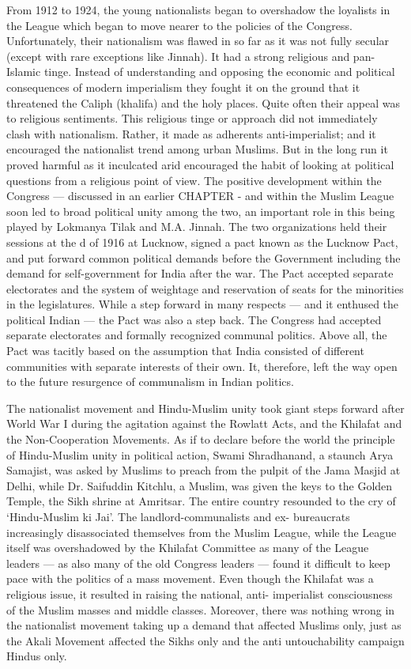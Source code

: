 From 1912 to 1924, the young nationalists began to overshadow the loyalists in the League which began to move nearer to the policies of the Congress. Unfortunately, their nationalism was flawed in so far as it was not fully secular (except with rare exceptions like Jinnah). It had a strong religious and pan-Islamic tinge. Instead of understanding and opposing the economic and political consequences of modern imperialism they fought it on the ground that it threatened the Caliph (khalifa) and the holy places. Quite often their appeal was to religious sentiments. This religious tinge or approach did not immediately clash with nationalism. Rather, it made as adherents anti-imperialist; and it encouraged the nationalist trend among urban Muslims. But in the long run it proved harmful as it inculcated arid encouraged the habit of looking at political questions from a religious point of view. The positive development within the Congress — discussed in an earlier CHAPTER - and within the Muslim League soon led to broad political unity among the two, an important role in this being played by Lokmanya Tilak and M.A. Jinnah. The two organizations held their sessions at the d of 1916 at Lucknow, signed a pact known as the Lucknow Pact, and put forward common political demands before the Government including the demand for self-government for India after the war. The Pact accepted separate electorates and the system of weightage and reservation of seats for the minorities in the legislatures. While a step forward in many respects — and it enthused the political Indian — the Pact was also a step back. The Congress had accepted separate electorates and formally recognized communal politics. Above all, the Pact was tacitly based on the assumption that India consisted of different communities with separate interests of their own. It, therefore, left the way open to the future resurgence of communalism in Indian politics. 

The nationalist movement and Hindu-Muslim unity took giant steps forward after World War I during the agitation against the Rowlatt Acts, and the Khilafat and the Non-Cooperation Movements. As if to declare before the world the principle of Hindu-Muslim unity in political action, Swami Shradhanand, a staunch Arya Samajist, was asked by Muslims to preach from the pulpit of the Jama Masjid at Delhi, while Dr. Saifuddin Kitchlu, a Muslim, was given the keys to the Golden Temple, the Sikh shrine at Amritsar. The entire country resounded to the cry of ‘Hindu-Muslim ki Jai’. The landlord-communalists and ex- bureaucrats increasingly disassociated themselves from the Muslim League, while the League itself was overshadowed by the Khilafat Committee as many of the League leaders — as also many of the old Congress leaders — found it difficult to keep pace with the politics of a mass movement. Even though the Khilafat was a religious issue, it resulted in raising the national, anti- imperialist consciousness of the Muslim masses and middle classes. Moreover, there was nothing wrong in the nationalist movement taking up a demand that affected Muslims only, just as the Akali Movement affected the Sikhs only and the anti­ untouchability campaign Hindus only. 

